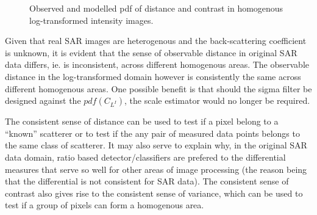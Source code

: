 \documentclass[journal]{IEEEtran}
\begin{document}
\begin{figure}[h!]
\centering
	\hfill
\caption{Observed and modelled pdf of distance and contrast in homogenous log-transformed intensity images.}
\label{fig:residual_as_noise}
\end{figure}

Given that real SAR images are heterogenous and the back-scattering coefficient is unknown, it is evident that the sense of observable distance in original SAR data differs, ie. is inconsistent, across different homogenous areas. The observable distance in the log-transformed domain however is consistently the same across different homogenous areas. One possible benefit is that should the sigma filter be designed against the $pdf(C_{L^I})$, the scale estimator would no longer be required. 

The consistent sense of distance can be used to test if a pixel belong to a ``known'' scatterer or to test if the any pair of measured data points belongs to the same class of scatterer. 
It may also serve to explain why, in the original SAR data domain, ratio based detector/classifiers are prefered to the differential measures that serve so well for other areas of image processing (the reason being that the differential is not consistent for SAR data).
The consistent sense of contrast also gives rise to the consistent sense of variance, which can be used to test if a group of pixels can form a homogenous area.


\end{document}
